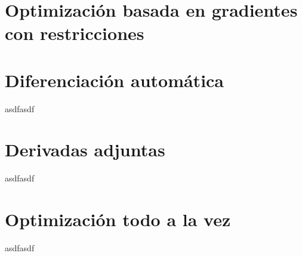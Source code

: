 \section{Optimización basada en gradientes con restricciones}


\section{Diferenciación automática}
asdfasdf

\section{Derivadas adjuntas}
asdfasdf

\section{Optimización todo a la vez}
asdfasdf
